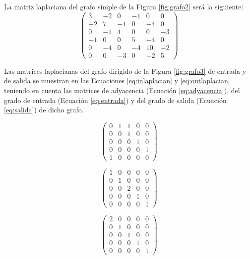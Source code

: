\begin{exampleth}
La matriz laplaciana del grafo simple de la Figura \ref{fig:grafo2} será la siguiente:
\begin{equation}
\begin{pmatrix}
3 & -2 & 0 & -1 & 0 & 0\\
-2 & 7 & -1 & 0 & -4 & 0\\
0 & -1 & 4 & 0 & 0 & -3\\
-1 & 0 & 0 & 5 & -4 & 0\\
0 & -4 & 0 & -4 & 10 & -2\\
0 & 0 & -3 & 0 & -2 & 5
\end{pmatrix}
\end{equation}
\end{exampleth}

\begin{exampleth}
Las matrices laplacianas del grafo dirigido de la Figura \ref{fig:grafo3} de entrada y de salida se muestran en las Ecuaciones \ref{eq:inlaplacian} y \ref{eq:outlaplacian} teniendo en cuenta las matrices de adyacencia (Ecuación \ref{eq:adyacencia}), del grado de entrada (Ecuación \ref{eq:entrada}) y del grado de salida (Ecuación \ref{eq:salida}) de dicho grafo.

\begin{equation}
\begin{pmatrix}
0 & 1 & 1 & 0 & 0\\
0 & 0 & 1 & 0 & 0\\
0 & 0 & 0 & 1 & 0\\
0 & 0 & 0 & 0 & 1\\
1 & 0 & 0 & 0 & 0
\end{pmatrix}
\label{eq:adyacencia}
\end{equation}

\begin{equation}
\begin{pmatrix}
1 & 0 & 0 & 0 & 0\\
0 & 1 & 0 & 0 & 0\\
0 & 0 & 2 & 0 & 0\\
0 & 0 & 0 & 1 & 0\\
0 & 0 & 0 & 0 & 1
\end{pmatrix}
\label{eq:entrada}
\end{equation}

\begin{equation}
\begin{pmatrix}
2 & 0 & 0 & 0 & 0\\
0 & 1 & 0 & 0 & 0\\
0 & 0 & 1 & 0 & 0\\
0 & 0 & 0 & 1 & 0\\
0 & 0 & 0 & 0 & 1
\end{pmatrix}
\label{eq:salida}
\end{equation}


\end{exampleth}
